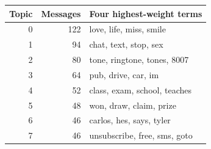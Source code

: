 \begin{tabular}{rrl}
\toprule
Topic & Messages & Four highest-weight terms \\
\midrule
0 & 122 & love, life, miss, smile \\
1 & 94 & chat, text, stop, sex \\
2 & 80 & tone, ringtone, tones, 8007 \\
3 & 64 & pub, drive, car, im \\
4 & 52 & class, exam, school, teaches \\
5 & 48 & won, draw, claim, prize \\
6 & 46 & carlos, hes, says, tyler \\
7 & 46 & unsubscribe, free, sms, goto \\
\bottomrule
\end{tabular}
